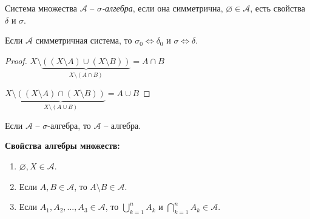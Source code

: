 \begin{definition}
    Система множества $\mathcal{A}$ – \textit{$\sigma$-алгебра}, если она симметрична, $\varnothing \in \mathcal{A}$, есть свойства $\delta$ и $\sigma$.
\end{definition}

\begin{statement}
    Если $\mathcal{A}$ симметричная система, то $\sigma_0\Leftrightarrow \delta_0$ и $\sigma\Leftrightarrow \delta$.
\end{statement}

\begin{proof}
    $X\setminus \underbrace{((X\setminus A)\cup (X\setminus B))}_{X\setminus (A\cap B)}= A\cap B$

    $X\setminus \underbrace{((X\setminus A)\cap (X\setminus B))}_{X\setminus (A\cup B)}= A\cup B$
\end{proof}

\begin{remark}
    Если $\mathcal{A}$ – $\sigma$-алгебра, то $\mathcal{A}$ – алгебра.
\end{remark}

\textbf{Свойства алгебры множеств:}

\begin{enumerate}
    \item $\varnothing, X\in \mathcal{A}$.
    \item Если $A, B \in \mathcal{A}$, то $A\setminus B\in \mathcal{A}$.
    \item Если $A_1, A_2, ..., A_3\in \mathcal{A}$, то $\bigcup\limits_{k = 1}^n A_k$ и $\bigcap\limits_{k = 1}^n A_k\in \mathcal{A}$.
\end{enumerate}

